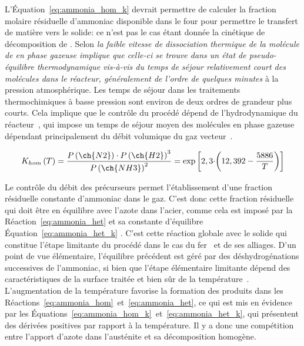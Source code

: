 
L'Équation~\ref{eq:ammonia_hom_k} devrait permettre de calculer la fraction molaire résiduelle d'ammoniac disponible dans le four pour permettre le transfert de matière vers le solide: ce n'est pas le cas étant donnée la cinétique de décomposition de . Selon \citet{Gantois2010} \og\textit{la faible vitesse de dissociation thermique de la molécule de  en phase gazeuse implique que celle-ci se trouve dans un état de pseudo-équilibre thermodynamique vis-à-vis du temps de séjour relativement court des molécules dans le réacteur, généralement de l'ordre de quelques minutes}\fg{} à la pression atmosphérique. Les temps de séjour dans les traitements thermochimiques à basse pression sont environ de deux ordres de grandeur plus courts. Cela implique que le contrôle du procédé dépend de l'hydrodynamique du réacteur~\cite{Slycke1981i,Ginter2006}, qui impose un temps de séjour moyen des molécules en phase gazeuse dépendant principalement du débit volumique du gaz vecteur~\cite{Gantois2010}.

\begin{equation}
K_{hom}\left(T\right)=
\frac{P\left(\ch{N2}\right)\cdot
  P\left(\ch{H2}\right)^{3}}{P\left(\ch{NH3}\right)^{2}}=
\exp\left[2,3\cdot\biggr(12,392-\frac{5886}{T}\biggr)\right]
\label{eq:ammonia_hom_k}
\end{equation}

Le contrôle du débit des précurseurs permet l'établissement d'une fraction résiduelle constante d'ammoniac dans le gaz. C'est donc cette fraction résiduelle qui doit être en équilibre avec l'azote dans l'acier, comme cela est imposé par la Réaction~\ref{eq:ammonia_het} et sa constante d'équilibre \textendash{} Équation~\ref{eq:ammonia_het_k} \textendash{} \cite{Slycke1981i,Yahia1995}. C'est cette réaction globale avec le solide qui constitue l'étape limitante du procédé dans le cas du fer~\cite{Slycke1981i} et de ses alliages. D'un point de vue élémentaire, l'équilibre précédent est géré par des déshydrogénations successives de l'ammoniac, si bien que l'étape élémentaire limitante dépend des caractéristiques de la surface traitée et bien sûr de la température~\cite{Aparicio1994}.  L'augmentation de la température favorise la formation des produits dans les Réactions~\ref{eq:ammonia_hom}~et~\ref{eq:ammonia_het}, ce qui est mis en évidence par les Équations~\ref{eq:ammonia_hom_k}~et~\ref{eq:ammonia_het_k}, qui présentent des dérivées positives par rapport à la température. Il y a donc une compétition entre l'apport d'azote dans l'austénite et sa décomposition homogène. 

